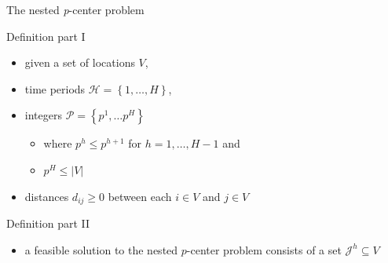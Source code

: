 \documentclass[utf8,aspectratio=1610,ngerman,english]{beamer}
\begin{document}
\begin{frame}{The nested \textit{p}-center problem}
    \begin{minipage}{0.48\textwidth}
        \begin{block}{Definition part I}
            \vspace*{2pt}
            \begin{itemize}
                \item given a set of locations $V$, \pause
                \item time periods $\mathcal H = \left \{1,\dots,H \right \}$, \pause
                \item integers $\mathcal P = \left \{p^1, \dots p^H \right \}$   \pause
                      \begin{itemize}
                          \item where $p^h \leq p^{h+1}$ for $h = 1, \dots, H-1$ and
                          \item $p^H \leq \left\lvert V \right\rvert$
                      \end{itemize} \pause
                \item distances $d_{ij} \geq 0$ between each $i \in V$ and $j \in V$ \pause
            \end{itemize}
            \vspace*{2pt}
        \end{block}
    \end{minipage}
    \begin{minipage}{0.48\textwidth}
        \begin{block}{Definition part II}
            \begin{itemize}
                \item a feasible solution to the nested $p$-center problem consists of a set $\mathcal J^h \subseteq V$ \pause

\end{itemize}
\end{block}
\end{minipage}
\end{frame}
\end{document}
